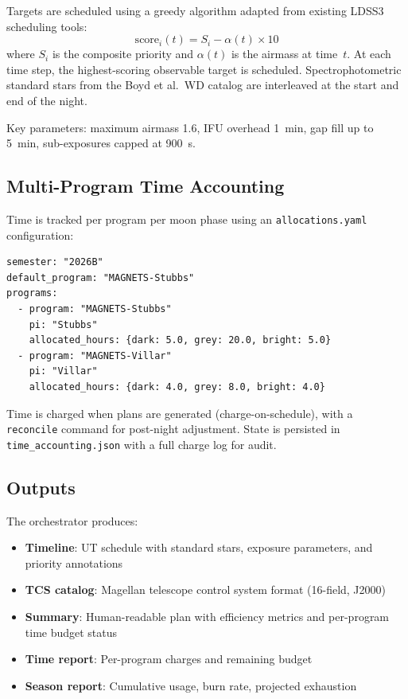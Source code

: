 \documentclass[11pt,letterpaper]{article}
\begin{document}
Targets are scheduled using a greedy algorithm adapted from existing
LDSS3 scheduling tools:
\begin{equation}
\mathrm{score}_i(t) = S_i - \alpha(t) \times 10
\end{equation}
where $S_i$ is the composite priority and $\alpha(t)$ is the airmass
at time~$t$.  At each time step, the highest-scoring observable target
is scheduled.  Spectrophotometric standard stars from the Boyd et al.\
WD catalog are interleaved at the start and end of the night.

Key parameters: maximum airmass 1.6, IFU overhead 1~min, gap fill up
to 5~min, sub-exposures capped at 900~s.

\subsection{Multi-Program Time Accounting}

Time is tracked per program per moon phase using an \texttt{allocations.yaml}
configuration:

\begin{lstlisting}[language={}]
semester: "2026B"
default_program: "MAGNETS-Stubbs"
programs:
  - program: "MAGNETS-Stubbs"
    pi: "Stubbs"
    allocated_hours: {dark: 5.0, grey: 20.0, bright: 5.0}
  - program: "MAGNETS-Villar"
    pi: "Villar"
    allocated_hours: {dark: 4.0, grey: 8.0, bright: 4.0}
\end{lstlisting}

Time is charged when plans are generated (charge-on-schedule), with a
\texttt{reconcile} command for post-night adjustment.  State is
persisted in \texttt{time\_accounting.json} with a full charge log for
audit.

\subsection{Outputs}

The orchestrator produces:
\begin{itemize}
\item \textbf{Timeline}: UT schedule with standard stars, exposure
parameters, and priority annotations
\item \textbf{TCS catalog}: Magellan telescope control system format
(16-field, J2000)
\item \textbf{Summary}: Human-readable plan with efficiency metrics and
per-program time budget status
\item \textbf{Time report}: Per-program charges and remaining budget
\item \textbf{Season report}: Cumulative usage, burn rate, projected
exhaustion
\end{itemize}
\end{document}
